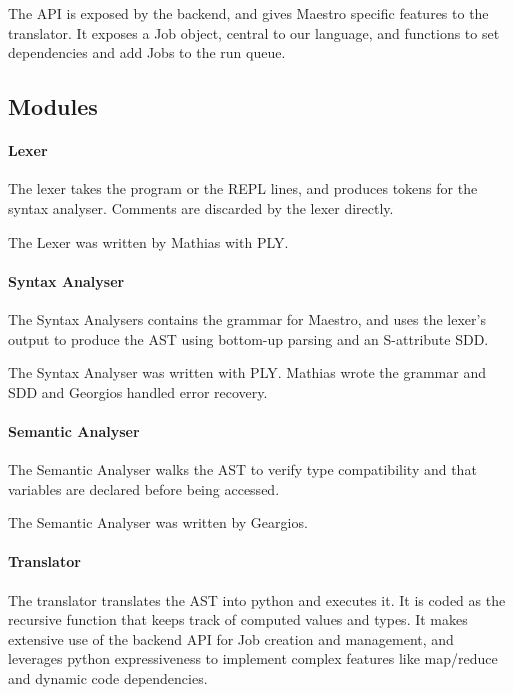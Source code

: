 The API is exposed by the backend, and gives Maestro specific features to the translator.
It exposes a Job object, central to our language, and functions to set dependencies and add Jobs
to the run queue.

\subsection{Modules}

\paragraph{Lexer}

The lexer takes the program or the REPL lines, and produces tokens for the syntax analyser.
Comments are discarded by the lexer directly.

The Lexer was written by Mathias with PLY.

\paragraph{Syntax Analyser}

The Syntax Analysers contains the grammar for Maestro, and uses the lexer's output to produce the AST using bottom-up parsing and an S-attribute SDD.

The Syntax Analyser was written with PLY. Mathias wrote the grammar and SDD and Georgios handled error recovery.

\paragraph{Semantic Analyser}

The Semantic Analyser walks the AST to verify type compatibility and that variables are declared before being accessed.

The Semantic Analyser was written by Geargios.

\paragraph{Translator}

The translator translates the AST into python and executes it.
It is coded as the recursive function that keeps track of computed values and types.
It makes extensive use of the backend API for Job creation and management, and leverages python expressiveness to implement complex features like map/reduce and dynamic code dependencies.

